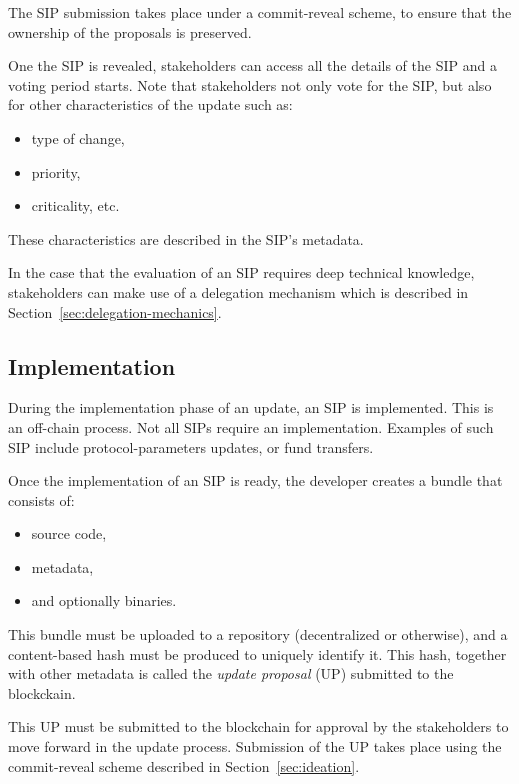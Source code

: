 \documentclass[11pt,a4paper]{article}
\begin{document}
The SIP submission takes place under a commit-reveal scheme, to ensure that the
ownership of the proposals is preserved.
%
%

One the SIP is revealed, stakeholders can access all the details of the SIP and
a voting period starts. Note that stakeholders not only vote for the SIP, but
also for other characteristics of the update such as:
\begin{itemize}
\item type of change,
\item priority,
\item criticality, etc.
\end{itemize}
These characteristics are described in the SIP's metadata.

In the case that the evaluation of an SIP requires deep technical knowledge,
stakeholders can make use of a delegation mechanism which is described in
Section~\ref{sec:delegation-mechanics}.

\subsection{Implementation}
\label{sec:implementation}

During the implementation phase of an update, an SIP is implemented. This is an
off-chain process. Not all SIPs require an implementation. Examples of such SIP
include protocol-parameters updates, or fund transfers.

Once the implementation of an SIP is ready, the developer creates a bundle that
consists of:
\begin{itemize}
\item source code,
\item metadata,
\item and optionally binaries.
\end{itemize}
This bundle must be uploaded to a repository (decentralized or otherwise), and a
content-based hash must be produced to uniquely identify it. This hash, together
with other metadata is called the \emph{update proposal} (UP)
submitted to the blockckain.

This UP must be submitted to the blockchain for approval by the stakeholders to
move forward in the update process. Submission of the UP takes place using the
commit-reveal scheme described in Section~\ref{sec:ideation}.

\end{document}
